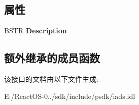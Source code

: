 \subsection*{属性}
\begin{DoxyCompactItemize}
\item 
\mbox{\label{interface_i_a_ds_group_accb1c1c957da4c7646beeae73cc7122e}} 
B\+S\+TR {\bfseries Description}
\end{DoxyCompactItemize}
\subsection*{额外继承的成员函数}


该接口的文档由以下文件生成\+:\begin{DoxyCompactItemize}
\item 
E\+:/\+React\+O\+S-\/0../sdk/include/psdk/iads.\+idl\end{DoxyCompactItemize}
